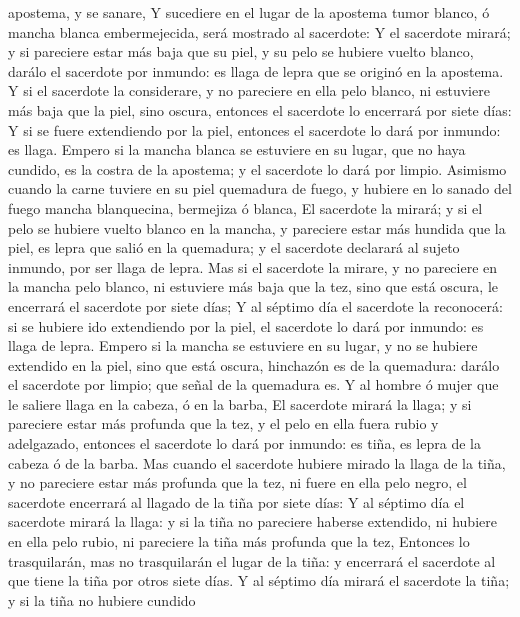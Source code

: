 apostema, y se sanare,  Y sucediere en el lugar de la
apostema tumor blanco, ó mancha blanca embermejecida, será mostrado al
sacerdote:  Y el sacerdote mirará; y si pareciere estar más
baja que su piel, y su pelo se hubiere vuelto blanco, darálo el
sacerdote por inmundo: es llaga de lepra que se originó en la apostema.
 Y si el sacerdote la considerare, y no pareciere en ella
pelo blanco, ni estuviere más baja que la piel, sino oscura, entonces el
sacerdote lo encerrará por siete días:  Y si se fuere
extendiendo por la piel, entonces el sacerdote lo dará por inmundo: es
llaga.  Empero si la mancha blanca se estuviere en su
lugar, que no haya cundido, es la costra de la apostema; y el sacerdote
lo dará por limpio.  Asimismo cuando la carne tuviere en su
piel quemadura de fuego, y hubiere en lo sanado del fuego mancha
blanquecina, bermejiza ó blanca,  El sacerdote la mirará; y
si el pelo se hubiere vuelto blanco en la mancha, y pareciere estar más
hundida que la piel, es lepra que salió en la quemadura; y el sacerdote
declarará al sujeto inmundo, por ser llaga de lepra.  Mas
si el sacerdote la mirare, y no pareciere en la mancha pelo blanco, ni
estuviere más baja que la tez, sino que está oscura, le encerrará el
sacerdote por siete días;  Y al séptimo día el sacerdote la
reconocerá: si se hubiere ido extendiendo por la piel, el sacerdote lo
dará por inmundo: es llaga de lepra.  Empero si la mancha
se estuviere en su lugar, y no se hubiere extendido en la piel, sino que
está oscura, hinchazón es de la quemadura: darálo el sacerdote por
limpio; que señal de la quemadura es.  Y al hombre ó mujer
que le saliere llaga en la cabeza, ó en la barba,  El
sacerdote mirará la llaga; y si pareciere estar más profunda que la tez,
y el pelo en ella fuera rubio y adelgazado, entonces el sacerdote lo
dará por inmundo: es tiña, es lepra de la cabeza ó de la barba.
 Mas cuando el sacerdote hubiere mirado la llaga de la
tiña, y no pareciere estar más profunda que la tez, ni fuere en ella
pelo negro, el sacerdote encerrará al llagado de la tiña por siete días:
 Y al séptimo día el sacerdote mirará la llaga: y si la
tiña no pareciere haberse extendido, ni hubiere en ella pelo rubio, ni
pareciere la tiña más profunda que la tez,  Entonces lo
trasquilarán, mas no trasquilarán el lugar de la tiña: y encerrará el
sacerdote al que tiene la tiña por otros siete días.  Y al
séptimo día mirará el sacerdote la tiña; y si la tiña no hubiere cundido
